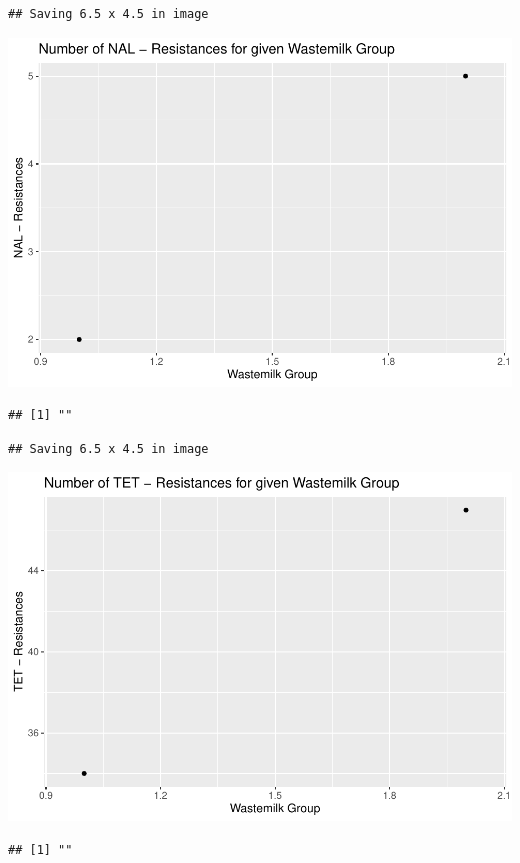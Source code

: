 \documentclass[
]{article}
\begin{document}
\begin{verbatim}
## Saving 6.5 x 4.5 in image
\end{verbatim}

\includegraphics{NResistenzen_files/figure-latex/binary_or_nominal_variables-7.pdf}

\begin{verbatim}
## [1] ""
\end{verbatim}

\begin{verbatim}
## Saving 6.5 x 4.5 in image
\end{verbatim}

\includegraphics{NResistenzen_files/figure-latex/binary_or_nominal_variables-8.pdf}

\begin{verbatim}
## [1] ""
\end{verbatim}
\end{document}
